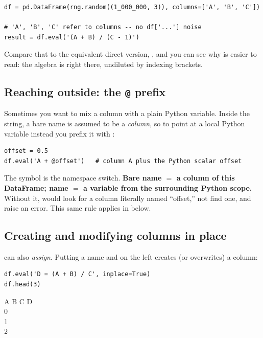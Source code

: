 \documentclass[11pt]{article}
\begin{document}
\begin{lstlisting}
df = pd.DataFrame(rng.random((1_000_000, 3)), columns=['A', 'B', 'C'])

# 'A', 'B', 'C' refer to columns -- no df['...'] noise
result = df.eval('(A + B) / (C - 1)')
\end{lstlisting}

Compare that to the equivalent direct version, , and you can see why  is easier to read: the algebra is right there, undiluted by indexing brackets.

\subsection{Reaching outside: the \texttt{@} prefix}

Sometimes you want to mix a column with a plain Python variable. Inside the string, a bare name is assumed to be a \emph{column}, so to point at a local Python variable instead you prefix it with :

\begin{lstlisting}
offset = 0.5
df.eval('A + @offset')   # column A plus the Python scalar offset
\end{lstlisting}

\begin{keyidea}
The  symbol is the namespace switch. \textbf{Bare name $=$ a column of this DataFrame; name $=$ a variable from the surrounding Python scope.} Without it,  would look for a column literally named ``offset,'' not find one, and raise an error. This same rule applies in  below.
\end{keyidea}

\subsection{Creating and modifying columns in place}

 can also \emph{assign}. Putting a name and \code{=} on the left creates (or overwrites) a column:

\begin{lstlisting}
df.eval('D = (A + B) / C', inplace=True)
df.head(3)
\end{lstlisting}

\begin{outbox}
\quad\quad A \quad\quad\;\; B \quad\quad\;\; C \quad\quad\;\; D \\
0 \; \; \; \; \\
1 \; \; \; \; \\
2 \; \; \; \;
\end{outbox}
\end{document}
